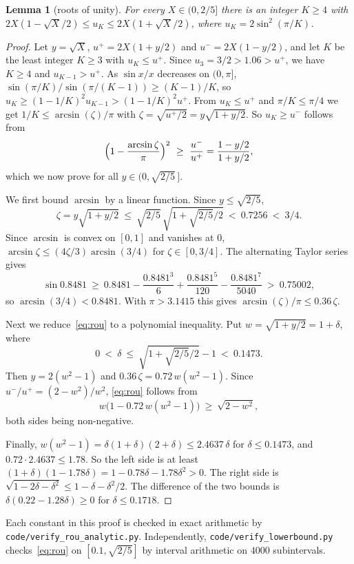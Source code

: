 \documentclass[11pt, a4paper]{article}
\newcommand{\file}{\nolinkurl}  %
\newtheorem{lemma}{Lemma}
\theoremstyle{definition}
\begin{document}
\begin{lemma}[roots of unity]
  \label{lem:rou}
  For every $X\in(0,2/5]$ there is an integer $K\ge4$ with
  $2X(1-\sqrt X/2)\le u_K\le2X(1+\sqrt X/2)$, where $u_K=2\sin^2(\pi/K)$.
\end{lemma}

\begin{proof}
  Let $y=\sqrt X$, $u^+=2X(1+y/2)$ and $u^-=2X(1-y/2)$, and let $K$ be the least integer $K\ge3$ with $u_K\le u^+$. Since
  $u_3=3/2>1.06>u^+$, we have $K\ge4$ and $u_{K-1}>u^+$. As $\sin x/x$ decreases on $(0,\pi]$,
  $\sin(\pi/K)/\sin(\pi/(K-1))\ge(K-1)/K$, so $u_K\ge(1-1/K)^2u_{K-1}>(1-1/K)^2u^+$. From $u_K\le u^+$ and $\pi/K\le\pi/4$
  we get $1/K\le\arcsin(\zeta)/\pi$ with $\zeta=\sqrt{u^+/2}=y\sqrt{1+y/2}$. So $u_K\ge u^-$ follows from
  \begin{equation}
    \Bigl(1-\frac{\arcsin\zeta}{\pi}\Bigr)^2\ \ge\ \frac{u^-}{u^+}=\frac{1-y/2}{1+y/2},
    \label{eq:rou}
  \end{equation}
  which we now prove for all $y\in(0,\sqrt{2/5}\,]$.

  We first bound $\arcsin$ by a linear function. Since $y\le\sqrt{2/5}$,
  \[
    \zeta=y\sqrt{1+y/2}\ \le\ \sqrt{2/5}\,\sqrt{1+\sqrt{2/5}/2}\ <\ 0.7256\ <\ 3/4.
  \]
  Since $\arcsin$ is convex on $[0,1]$ and vanishes at $0$, $\arcsin\zeta\le(4\zeta/3)\arcsin(3/4)$ for $\zeta\in[0,3/4]$. The
  alternating Taylor series gives
  \[
    \sin0.8481\ \ge\ 0.8481-\frac{0.8481^3}{6}+\frac{0.8481^5}{120}-\frac{0.8481^7}{5040}\ >\ 0.75002,
  \]
  so $\arcsin(3/4)<0.8481$. With $\pi>3.1415$ this gives $\arcsin(\zeta)/\pi\le0.36\,\zeta$.

  Next we reduce~\eqref{eq:rou} to a polynomial inequality. Put $w=\sqrt{1+y/2}=1+\delta$, where
  \[
    0\ <\ \delta\ \le\ \sqrt{1+\sqrt{2/5}/2}-1\ <\ 0.1473.
  \]
  Then $y=2(w^2-1)$ and $0.36\,\zeta=0.72\,w(w^2-1)$. Since
  $u^-/u^+=(2-w^2)/w^2$, \eqref{eq:rou} follows from
  \[
    w\bigl(1-0.72\,w(w^2-1)\bigr)\ \ge\ \sqrt{2-w^2},
  \]
  both sides being non-negative.

  Finally, $w(w^2-1)=\delta(1+\delta)(2+\delta)\le2.4637\,\delta$ for $\delta\le0.1473$, and $0.72\cdot2.4637\le1.78$. So the left side
  is at least $(1+\delta)(1-1.78\delta)=1-0.78\delta-1.78\delta^2>0$. The right side is $\sqrt{1-2\delta-\delta^2}\le1-\delta-\delta^2/2$. The
  difference of the two bounds is $\delta(0.22-1.28\delta)\ge0$ for $\delta\le0.1718$.
\end{proof}

Each constant in this proof is checked in exact arithmetic by \file{code/verify_rou_analytic.py}. Independently,
\file{code/verify_lowerbound.py} checks~\eqref{eq:rou} on $[0.1,\sqrt{2/5}]$ by interval arithmetic on $4000$
subintervals.
\end{document}
